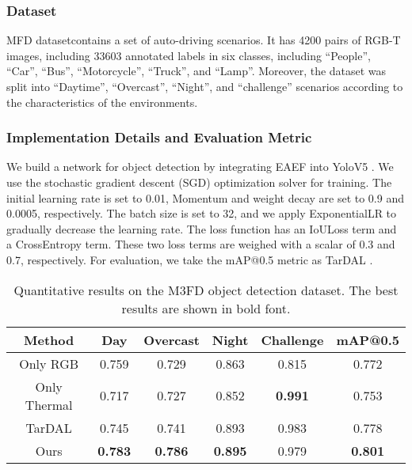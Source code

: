 \documentclass[letterpaper, 10 pt, journal, twoside]{IEEEtran}
\begin{document}
\subsubsection{Dataset}
MFD dataset\cite{m3fd}contains a set of auto-driving scenarios. It has 4200 pairs of RGB-T images, including 33603 annotated labels in six classes, including ``People'', ``Car'', ``Bus'', ``Motorcycle'', ``Truck'', and ``Lamp''. Moreover, the dataset was split into ``Daytime'', ``Overcast'', ``Night'', and ``challenge'' scenarios according to the characteristics of the environments.

\subsubsection{Implementation Details and Evaluation Metric}
We build a network for object detection by integrating EAEF into YoloV5 \cite{mmyolo}.  We use the stochastic gradient descent (SGD)\cite{SGD} optimization solver for training. The initial learning rate is set to 0.01, Momentum and weight decay are set to 0.9 and 0.0005, respectively. The batch size is set to 32, and we apply ExponentialLR to gradually decrease the learning rate. The loss function has an IoULoss \cite{Iouloss} term and a CrossEntropy \cite{celoss} term. These two loss terms are weighed with a scalar of 0.3 and 0.7, respectively. For evaluation, we take the mAP@0.5 metric as TarDAL \cite{m3fd}. 

\begin{table}[!t]
  \centering
  \caption{Quantitative results on the M3FD object detection dataset. The best results are shown in bold font.}
    \begin{tabular}{cccccc}
    \toprule
    Method & Day   & Overcast & Night & Challenge & {mAP@0.5} \\
    \midrule
   Only RGB & 0.759 & 0.729 & 0.863 & 0.815 & 0.772 \\
   Only Thermal & 0.717 & 0.727 & 0.852 & \textbf{0.991} & 0.753 \\
    TarDAL\cite{m3fd} & 0.745 & 0.741 & 0.893 & 0.983 & 0.778 \\
    Ours & \textbf{0.783} & \textbf{0.786} & \textbf{0.895} & 0.979 & \textbf{0.801} \\
    \bottomrule
    \end{tabular}\label{res_m3fd}\end{table}
\end{document}
